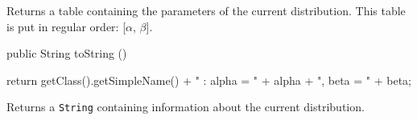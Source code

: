 \begin{tabb}
   Returns a table containing the parameters of the current distribution.
   This table is put in regular order: [$\alpha$, $\beta$].
\end{tabb}
\begin{hide}\begin{code}

   public String toString ()\begin{hide} {
      return getClass().getSimpleName() + " : alpha = " + alpha + ", beta = " + beta;
   }\end{hide}
\end{code}
\begin{tabb}
   Returns a \texttt{String} containing information about the current distribution.
\end{tabb}\end{hide}
\begin{code}\begin{hide}
}\end{hide}
\end{code}
